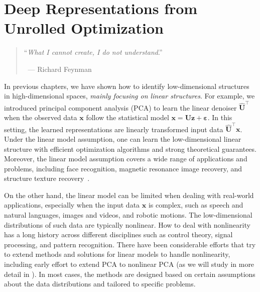 \documentclass[../../book-main.tex]{subfiles}
\begin{document}
\chapter{Deep Representations from Unrolled Optimization}
\label{ch:representation}
\label{ch:unrolling}

\begin{quote}
\hfill    ``{\em What I cannot create, I do not understand}.''

$~$ \hfill --- Richard Feynman   
\end{quote}
\vspace{5mm}




In previous chapters, we have shown how to identify low-dimensional structures in high-dimensional spaces, \textit{mainly focusing on linear structures}. 
For example, we introduced principal component analysis (PCA) to learn the linear denoiser $\hat{\bm{U}}^{\top}$ when the observed data $\bm{x}$ follow the statistical model $\bm{x} = \bm{U}\bm{z} + \bm{\varepsilon}$. 
In this setting, the learned representations are linearly transformed input data $\hat{\bm{U}}^{\top}\bm{x}$.
Under the linear model assumption, one can learn the low-dimensional linear structure with efficient optimization algorithms and strong theoretical guarantees. 
Moreover, the linear model assumption covers a wide range of applications and problems, including face recognition, magnetic resonance image recovery, and structure texture recovery~\cite{Wright-Ma-2022}.

On the other hand, the linear model can be limited when dealing with real-world applications, especially when the input data $\bm{x}$ is complex, such as speech and natural languages, images and videos, and robotic motions. The low-dimensional distributions of such data are typically nonlinear. 
How to deal with nonlinearity has a long history across different disciplines such as control theory, signal processing, and pattern recognition.  There have been considerable efforts that try to extend methods and solutions for linear models to handle nonlinearity, including early effort to extend PCA to nonlinear PCA (as we will study in more detail in ).  In most cases, the methods are designed based on certain assumptions about the data distributions and tailored to specific problems. 
\end{document}
